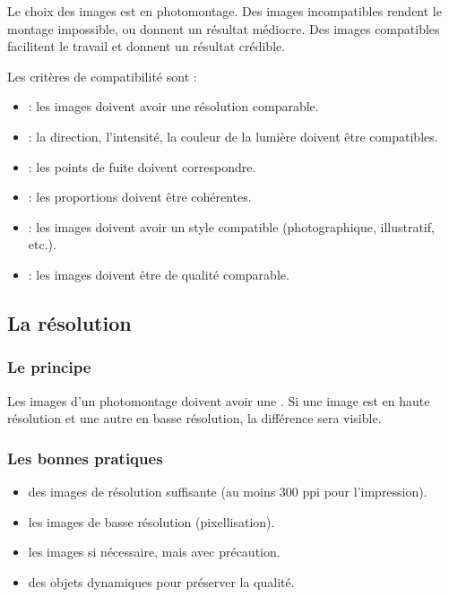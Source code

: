 Le choix des images est  en photomontage. Des images incompatibles rendent le montage impossible, ou donnent un résultat médiocre. Des images compatibles facilitent le travail et donnent un résultat crédible.

Les critères de compatibilité sont :

\begin{itemize}
    \item {} : les images doivent avoir une résolution comparable.
    \item {} : la direction, l'intensité, la couleur de la lumière doivent être compatibles.
    \item {} : les points de fuite doivent correspondre.
    \item {} : les proportions doivent être cohérentes.
    \item {} : les images doivent avoir un style compatible (photographique, illustratif, etc.).
    \item {} : les images doivent être de qualité comparable.
\end{itemize}

\subsection{La résolution}

\subsubsection{Le principe}

Les images d'un photomontage doivent avoir une . Si une image est en haute résolution et une autre en basse résolution, la différence sera visible.

\subsubsection{Les bonnes pratiques}

\begin{itemize}
    \item {} des images de résolution suffisante (au moins 300 ppi pour l'impression).
    \item {} les images de basse résolution (pixellisation).
    \item {} les images si nécessaire, mais avec précaution.
    \item {} des objets dynamiques pour préserver la qualité.
\end{itemize}

